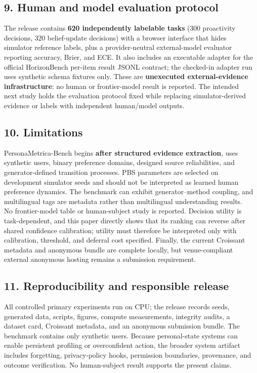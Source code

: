 \documentclass[
  10pt,
  letterpaper,
]{article}
\begin{document}
\subsection{9. Human and model evaluation
protocol}\label{human-and-model-evaluation-protocol}

The release contains \textbf{620 independently labelable tasks} (300
proactivity decisions, 320 belief-update decisions) with a browser
interface that hides simulator reference labels, plus a provider-neutral
external-model evaluator reporting accuracy, Brier, and ECE. It also
includes an executable adapter for the official HorizonBench per-item
result JSONL contract; the checked-in adapter run uses synthetic schema
fixtures only. These are \textbf{unexecuted external-evidence
infrastructure}: no human or frontier-model result is reported. The
intended next study holds the evaluation protocol fixed while replacing
simulator-derived evidence or labels with independent human/model
outputs.

\subsection{10. Limitations}\label{limitations}

PersonaMetrica-Bench begins \textbf{after structured evidence
extraction}, uses synthetic users, binary preference domains, designed
source reliabilities, and generator-defined transition processes. PBS
parameters are selected on development simulator seeds and should not be
interpreted as learned human preference dynamics. The benchmark can
exhibit generator--method coupling, and multilingual tags are metadata
rather than multilingual understanding results. No frontier-model table
or human-subject study is reported. Decision utility is task-dependent,
and this paper directly shows that its ranking can reverse after shared
confidence calibration; utility must therefore be interpreted only with
calibration, threshold, and deferral cost specified. Finally, the
current Croissant metadata and anonymous bundle are complete locally,
but venue-compliant external anonymous hosting remains a submission
requirement.

\subsection{11. Reproducibility and responsible
release}\label{reproducibility-and-responsible-release}

All controlled primary experiments run on CPU; the release records
seeds, generated data, scripts, figures, compute measurements, integrity
audits, a dataset card, Croissant metadata, and an anonymous submission
bundle. The benchmark contains only synthetic users. Because
personal-state systems can enable persistent profiling or overconfident
action, the broader system artifact includes forgetting, privacy-policy
hooks, permission boundaries, provenance, and outcome verification. No
human-subject result supports the present claims.
\end{document}
